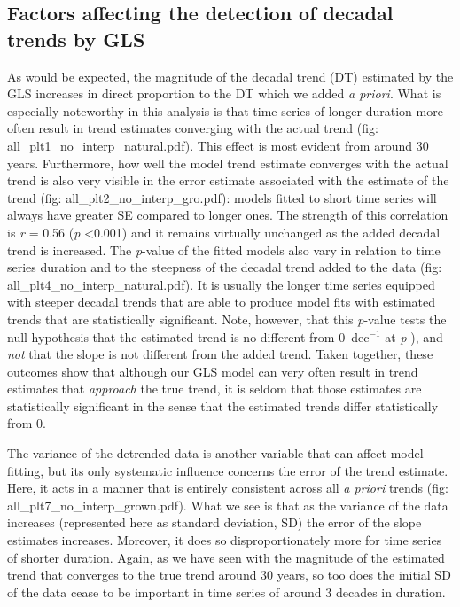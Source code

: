 \documentclass{ametsoc}
\begin{document}
\subsection{Factors affecting the detection of decadal trends by GLS}
As would be expected, the magnitude of the decadal trend (DT) estimated by the GLS increases in direct proportion to the DT which we added \emph{a priori}. What is especially noteworthy in this analysis is that time series of longer duration more often result in trend estimates converging with the actual trend (fig: all_plt1_no_interp_natural.pdf). This effect is most evident from around 30 years. Furthermore, how well the model trend estimate converges with the actual trend is also very visible in the error estimate associated with the estimate of the trend (fig: all_plt2_no_interp_gro.pdf): models fitted to short time series will always have greater SE compared to longer ones. The strength of this correlation  is \emph{r} = 0.56 (\emph{p} <0.001) and it remains virtually unchanged as the added decadal trend is increased. The \emph{p}-value of the fitted models also vary in relation to time series duration and to the steepness of the decadal trend added to the data (fig: all_plt4_no_interp_natural.pdf). It is usually the longer time series equipped with steeper decadal trends that are able to produce model fits with estimated trends that are statistically significant. Note, however, that this \emph{p}-value tests the null hypothesis that the estimated trend is no different from \si{0}{\degreeCelsius}~dec$^{-1}$ at \emph{p} ), and \emph{not} that the slope is not different from the added trend. Taken together, these outcomes show that although our GLS model can very often result in trend estimates that \emph{approach} the true trend, it is seldom that those estimates are statistically significant in the sense that the estimated trends differ statistically from 0.

The variance of the detrended data is another variable that can affect model fitting, but its only systematic influence concerns the error of the trend estimate. Here, it acts in a manner that is entirely consistent across all \emph{a priori} trends (fig: all_plt7_no_interp_grown.pdf). What we see is that as the variance of the data increases (represented here as standard deviation, SD) the error of the slope estimates increases. Moreover, it does so disproportionately more for time series of shorter duration. Again, as we have seen with the magnitude of the estimated trend that converges to the true trend around 30 years, so too does the initial SD of the data cease to be important in time series of around 3 decades in duration.
\end{document}
